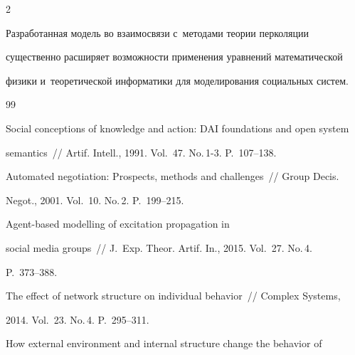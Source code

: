 \begin{multicols}{2}
  


  Разработанная модель во взаимосвязи с~методами теории перколяции 


существенно расширяет возможности применения уравнений математической 


физики и~теоретической информатики для моделирования социальных систем.





\vspace*{-6pt}


  


{\small\frenchspacing


{\baselineskip=10.85pt




\begin{thebibliography}{99}




 Social conceptions of knowledge and action: DAI foundations and open system 


semantics~// Artif. Intell., 1991. Vol.~47. No.\,1-3. P.~107--138.






Automated negotiation: Prospects, methods and challenges~// Group Decis.


Negot., 2001. Vol.~10. No.\,2. P.~199--215.




 Agent-based modelling of excitation propagation in 


social media groups~// J.~Exp. Theor. Artif. In., 2015. Vol.~27. No.\,4. 


P.~373--388.







 The effect of network structure on individual behavior~// Complex Systems, 


2014. Vol.~23. No.\,4. P.~295--311.







 How external environment and internal structure change the behavior of 



\end{thebibliography}}}
\end{multicols}
